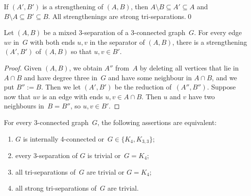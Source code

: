 \documentclass{aic}
\newcommand{\se}{\subseteq}
\theoremstyle{plain}
\theoremstyle{definition}
\theoremstyle{plain}
\theoremstyle{plain}
\newcommand{\sm}{\setminus}
\begin{document}
\begin{obs}\label{strengthening-good}
    If $(A',B')$ is a strengthening of $(A,B)$, then $A\sm B\se A'\se A$ and $B\sm A\se B'\se B$. 
    All strengthenings are strong tri-separations.\qed
\end{obs}

\begin{lem}\label{reduceToStrong}
Let $(A,B)$ be a mixed 3-separation of a 3-connected graph~$G$.
For every edge $uv$ in~$G$ with both ends $u,v$ in the separator of $(A,B)$,
there is a strengthening $(A',B')$ of $(A,B)$ so that $u,v\in B'$.
\end{lem}
\begin{proof}
Given $(A,B)$, we obtain $A''$ from~$A$ by deleting all vertices that lie in $A\cap B$ and have degree three in~$G$ and have some neighbour in $A\cap B$, and we put $B'':=B$.
Then we let $(A',B')$ be the reduction of~$(A'',B'')$.
Suppose now that $uv$ is an edge with ends $u,v\in A\cap B$.
Then $u$ and $v$ have two neighbours in~$B=B''$, so $u,v\in B'$.
\end{proof}



\begin{prop}\label{tetraXtrisep}
For every 3-connected graph~$G$, the following assertions are equivalent:
\begin{enumerate}
    \item\label{ItemTetra} $G$ is internally 4-connected or~$G\in\{K_4,K_{3,3}\}$;
        \item\label{ItemTetra_neu} every 3-separation of $G$ is trivial or~$G=K_4$;
        \item\label{ItemTrivial1} all tri-separations of~$G$ are trivial or $G=K_4$;
    \item\label{ItemTrivial2} all strong tri-separations of~$G$ are trivial.
\end{enumerate}
\end{prop}
\end{document}

